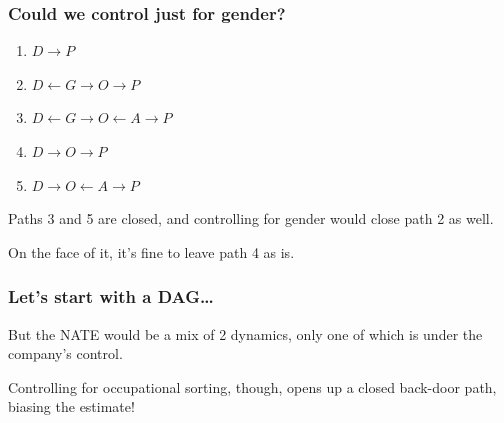 \documentclass[12pt,english,dvipsnames,aspectratio=169,handout]{beamer}
\begin{document}
\begin{frame}
	\frametitle{Could we control just for gender?}
	\begin{minipage}{0.48\linewidth}
		\begin{enumerate}
			\item $D \rightarrow P$ 
			\item $D \leftarrow G \rightarrow O \rightarrow P$
			\item $D \leftarrow G \rightarrow O \leftarrow A \rightarrow P$
		\end{enumerate}
	\end{minipage}
	\begin{minipage}{0.48\linewidth}
		\begin{enumerate}
			\setcounter{enumi}{3}
			\item $D \rightarrow O \rightarrow P$
			\item $D \rightarrow O \leftarrow A \rightarrow P$
		\end{enumerate}
	\end{minipage}\bigskip

	Paths 3 and 5 are closed, and controlling for gender would close path 2 as well.\bigskip
	
	\pause
	
	On the face of it, it's fine to leave path 4 as is.
	
\end{frame}


\begin{frame}
	\frametitle{Let's start with a DAG\dots}
	\begin{figure}
		\begin{spacing}{0.5}
		\end{spacing}
	\end{figure}
	
	But the NATE would be a mix of 2 dynamics, only one of which is under the company's control.\bigskip
	
	\pause
	
	Controlling for occupational sorting, though, opens up a closed back-door path, biasing the estimate!
	
\end{frame}
\end{document}
